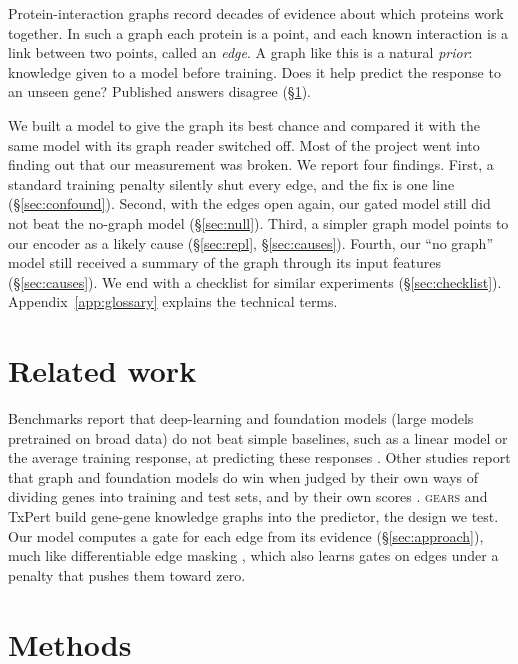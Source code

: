 \documentclass{article}
\begin{document}
Protein-interaction graphs record decades of evidence about which proteins work together. In such a
graph each protein is a point, and each known interaction is a link between two points, called an
\emph{edge}. A graph like this is a natural \emph{prior}: knowledge given to a model before training.
Does it help predict the response to an unseen gene? Published answers disagree (\S\ref{sec:related}).

We built a model to give the graph its best chance and compared it with the same model with its graph
reader switched off. Most of the project went into finding out that our measurement was broken. We
report four findings. First, a standard training penalty silently shut every edge, and the fix is one
line (\S\ref{sec:confound}). Second, with the edges open again, our gated model still did not beat the
no-graph model (\S\ref{sec:null}). Third, a simpler graph model points to our encoder as a likely cause
(\S\ref{sec:repl}, \S\ref{sec:causes}). Fourth, our ``no graph'' model still received a summary of the
graph through its input features (\S\ref{sec:causes}). We end with a checklist for similar experiments
(\S\ref{sec:checklist}). Appendix~\ref{app:glossary} explains the technical terms.

\section{Related work}
\label{sec:related}

Benchmarks report that deep-learning and foundation models (large models pretrained on broad data) do not
beat simple baselines, such as a linear model or the average training response, at predicting these
responses \citep{ahlmanneltze2025linear,wongmoccia2025crispr}. Other studies report that graph and
foundation models do win when judged by their own ways of dividing genes into training and test sets, and
by their own scores \citep{wenkel2026txpert,cole2026foundation}. \textsc{gears} \citep{roohani2024gears}
and TxPert \citep{wenkel2026txpert} build gene-gene knowledge graphs into the predictor, the design we
test. Our model computes a gate for each edge from its evidence (\S\ref{sec:approach}), much like
differentiable edge masking
\citep{schlichtkrull2021graphmask}, which also learns gates on edges under a penalty that pushes them
toward zero.

\section{Methods}
\end{document}
